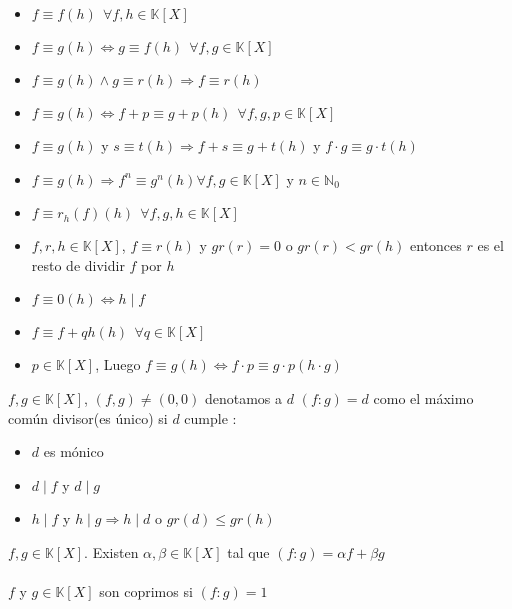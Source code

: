 \documentclass[a4paper,10pt]{article}
\begin{document}
\propiedades
\begin{itemize}
	\item $f \equiv f (h) \ \ \forall f,h \in \mathbb{K}[X]$
	\item $f \equiv g (h) \Leftrightarrow g \equiv f (h) \ \ \forall f,g \in \mathbb{K}[X]$
	\item $f \equiv g (h) \wedge g \equiv r (h) \Rightarrow f \equiv r (h)$
	\item $f \equiv g (h) \Leftrightarrow f + p \equiv g + p (h) \ \ \forall f,g,p \in \mathbb{K}[X]$ 
	\item $f \equiv g (h)$ y $s \equiv t (h) \Rightarrow f + s \equiv g + t (h)$ y $f \cdot g \equiv g \cdot t (h)$ 
	\item $f \equiv g (h) \Rightarrow f^{n} \equiv g^{n} (h) \forall f,g \in \mathbb{K}[X]$ y $n \in \mathbb{N}_0$
	\item $f \equiv r_{h}(f) (h) \ \ \forall f,g,h \in \mathbb{K}[X]$
	\item $f,r,h \in \mathbb{K}[X]$, $f \equiv r (h)$ y $gr(r) = 0$ o $gr(r) < gr(h)$ entonces $r$ es el resto de dividir $f$ por $h$ 
	\item $f \equiv 0 (h) \Leftrightarrow h \mid f$
	\item $f \equiv f + qh (h) \ \ \forall q \in \mathbb{K}[X]$
	\item $p \in \mathbb{K}[X]$, Luego $f \equiv g (h) \Leftrightarrow f \cdot p \equiv g \cdot p (h \cdot g)$
\end{itemize}


 $f,g \in \mathbb{K}[X]$, $(f,g) \neq (0,0)$ denotamos a $d$ $(f:g) = d$ como el máximo común divisor(es único) si $d$ cumple :
\begin{itemize}
	\item $d$ es mónico
	\item $d \mid f$ y $d \mid g$
	\item $h \mid f$ y $h \mid g \Rightarrow h \mid d$ o $gr(d) \leq gr(h)$
\end{itemize}

\propiedad $f,g \in \mathbb{K}[X]$. Existen $\alpha,\beta \in \mathbb{K}[X]$ tal que $(f:g) = \alpha f + \beta g$ \\ \\

 $f$ y $g \in \mathbb{K}[X]$ son coprimos si $(f:g)=1$ \\ \\
\end{document}
